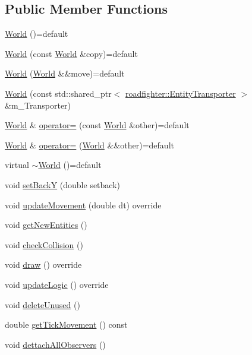 \subsection*{Public Member Functions}
\begin{DoxyCompactItemize}
\item 
\hyperlink{classroadfighter_1_1World_aa75df604422c5e2f160d082da86a50c4}{World} ()=default
\item 
\hyperlink{classroadfighter_1_1World_aa2f34c06cc3b81a6cd3f862137f1786b}{World} (const \hyperlink{classroadfighter_1_1World}{World} \&copy)=default
\item 
\hyperlink{classroadfighter_1_1World_aabd6663f3ee5533809152f154064cd89}{World} (\hyperlink{classroadfighter_1_1World}{World} \&\&move)=default
\item 
\hyperlink{classroadfighter_1_1World_ad1c38e0c158813af36113953003362d1}{World} (const std\+::shared\+\_\+ptr$<$ \hyperlink{classroadfighter_1_1EntityTransporter}{roadfighter\+::\+Entity\+Transporter} $>$ \&m\+\_\+\+Transporter)
\item 
\hyperlink{classroadfighter_1_1World}{World} \& \hyperlink{classroadfighter_1_1World_a31482bef8cfc86abc6326a4ffca74872}{operator=} (const \hyperlink{classroadfighter_1_1World}{World} \&other)=default
\item 
\hyperlink{classroadfighter_1_1World}{World} \& \hyperlink{classroadfighter_1_1World_ae2c0a8c3c8abd624087d5c5d82c2d5fd}{operator=} (\hyperlink{classroadfighter_1_1World}{World} \&\&other)=default
\item 
virtual \hyperlink{classroadfighter_1_1World_aea82fc8fead2cfb0032de65b1a198058}{$\sim$\+World} ()=default
\item 
void \hyperlink{classroadfighter_1_1World_abaf87df4c66473070ccf57bacbe56419}{set\+BackY} (double setback)
\item 
void \hyperlink{classroadfighter_1_1World_a880776b589376b1b4fd5ed4f26de4482}{update\+Movement} (double dt) override
\item 
void \hyperlink{classroadfighter_1_1World_a8d20efd557fc36fdf6218c0fdedd0b5a}{get\+New\+Entities} ()
\item 
void \hyperlink{classroadfighter_1_1World_ad04348a1285e8246abfacf32b600866f}{check\+Collision} ()
\item 
void \hyperlink{classroadfighter_1_1World_a90534263a154d6d7c1e8aef4e0138881}{draw} () override
\item 
void \hyperlink{classroadfighter_1_1World_a066592a75c8a38e241013707b429206c}{update\+Logic} () override
\item 
void \hyperlink{classroadfighter_1_1World_af7b77b0be8fee9e26093e2990f3889aa}{delete\+Unused} ()
\item 
double \hyperlink{classroadfighter_1_1World_a37fb93dcb90ec720a4ef17c43cf64dd4}{get\+Tick\+Movement} () const
\item 
void \hyperlink{classroadfighter_1_1World_a82f62356ff13d7b52372f5568803686d}{dettach\+All\+Observers} ()
\end{DoxyCompactItemize}


